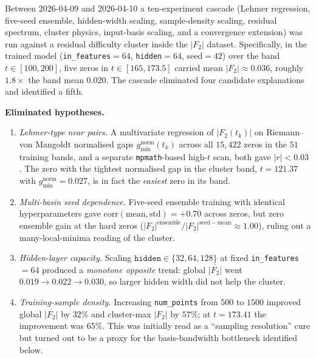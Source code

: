 \documentclass[11pt, a4paper]{article}
\theoremstyle{definition}
\theoremstyle{plain}
\begin{document}
Between 2026-04-09 and 2026-04-10 a ten-experiment cascade
(Lehmer regression, five-seed ensemble, hidden-width scaling,
sample-density scaling, residual spectrum, cluster physics,
input-basis scaling, and a convergence extension) was run
against a residual difficulty cluster inside the $|F_2|$
dataset. Specifically, in the trained model
(\texttt{in\_features}$=64$, \texttt{hidden}$=64$, seed$=42$)
over the band $t\in[100,200]$, five zeros in
$t\in[165,173.5]$ carried mean $|F_2|\approx 0.036$, roughly
$1.8\times$ the band mean $0.020$. The cascade eliminated four
candidate explanations and identified a fifth.

\smallskip
\noindent\textbf{Eliminated hypotheses.}
\begin{enumerate}
  \item[(E1)] \emph{Lehmer-type near pairs.} A multivariate
        regression of $|F_2(t_k)|$ on Riemann--von Mangoldt
        normalised gaps $g_{\min}^{\mathrm{norm}}(t_k)$ across
        all $15{,}422$ zeros in the $51$ training bands, and a
        separate \texttt{mpmath}-based high-$t$ scan, both gave
        $|r|<0.03$. The zero with the tightest normalised gap in
        the cluster band, $t=121.37$ with
        $g_{\min}^{\mathrm{norm}}=0.027$, is in fact the
        \emph{easiest} zero in its band.
  \item[(E2)] \emph{Multi-basin seed dependence.} Five-seed
        ensemble training with identical hyperparameters
        gave $\mathrm{corr}(\mathrm{mean},\mathrm{std})=+0.70$
        across zeros, but zero ensemble gain at the hard zeros
        ($|F_2|^{\mathrm{ensemble}}/|F_2|^{\mathrm{seed-mean}}
        \approx 1.00$), ruling out a
        many-local-minima reading of the cluster.
  \item[(E3)] \emph{Hidden-layer capacity.} Scaling
        $\texttt{hidden}\in\{32,64,128\}$ at fixed
        \texttt{in\_features}$=64$ produced a \emph{monotone
        opposite} trend: global $\overline{|F_2|}$ went
        $0.019\to 0.022\to 0.030$, so larger hidden width did
        not help the cluster.
  \item[(E4)] \emph{Training-sample density.} Increasing
        \texttt{num\_points} from $500$ to $1500$ improved
        global $\overline{|F_2|}$ by $32\%$ and cluster-max
        $|F_2|$ by $57\%$; at $t=173.41$ the improvement was
        $65\%$. This was initially read as a ``sampling
        resolution'' cure but turned out to be a proxy for the
        basis-bandwidth bottleneck identified below.
\end{enumerate}
\end{document}
